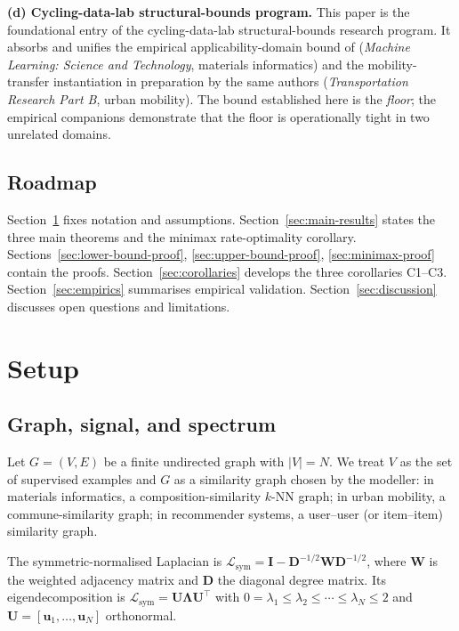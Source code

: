 \documentclass[11pt,a4paper]{article}
\theoremstyle{plain}
\theoremstyle{definition}
\theoremstyle{remark}
\newcommand{\bU}{\mathbf{U}}
\newcommand{\bI}{\mathbf{I}}
\newcommand{\bu}{\mathbf{u}}
\newcommand{\bD}{\mathbf{D}}
\newcommand{\bW}{\mathbf{W}}
\newcommand{\Lsym}{\mathcal{L}_{\mathrm{sym}}}
\begin{document}
\textbf{(d) Cycling-data-lab structural-bounds program.}  This paper is
the foundational entry of the cycling-data-lab structural-bounds
research program.  It absorbs and unifies the empirical
applicability-domain bound of \citet{FossePallares2026applicabilityBound}
(\emph{Machine Learning: Science and Technology}, materials informatics)
and the mobility-transfer instantiation in preparation by the same
authors (\emph{Transportation Research Part B}, urban mobility).  The bound
established here is the \emph{floor}; the empirical companions
demonstrate that the floor is operationally tight in two unrelated
domains.

\subsection{Roadmap}

Section~\ref{sec:setup} fixes notation and assumptions.
Section~\ref{sec:main-results} states the three main theorems and the
minimax rate-optimality corollary.  Sections~\ref{sec:lower-bound-proof},
\ref{sec:upper-bound-proof}, \ref{sec:minimax-proof} contain the proofs.
Section~\ref{sec:corollaries} develops the three corollaries C1--C3.
Section~\ref{sec:empirics} summarises empirical validation.
Section~\ref{sec:discussion} discusses open questions and limitations.

\section{Setup}
\label{sec:setup}

\subsection{Graph, signal, and spectrum}

Let $G = (V, E)$ be a finite undirected graph with $|V| = N$.  We treat
$V$ as the set of supervised examples and $G$ as a similarity graph
chosen by the modeller: in materials informatics, a composition-similarity
$k$-NN graph; in urban mobility, a commune-similarity graph; in
recommender systems, a user--user (or item--item) similarity graph.

The symmetric-normalised Laplacian is
$\Lsym = \bI - \bD^{-1/2} \bW \bD^{-1/2}$, where $\bW$ is the
weighted adjacency matrix and $\bD$ the diagonal degree matrix.  Its
eigendecomposition is $\Lsym = \bU \boldsymbol{\Lambda} \bU^\top$ with
$0 = \lambda_1 \leq \lambda_2 \leq \cdots \leq \lambda_N \leq 2$ and
$\bU = [\bu_1, \ldots, \bu_N]$ orthonormal.
\end{document}
